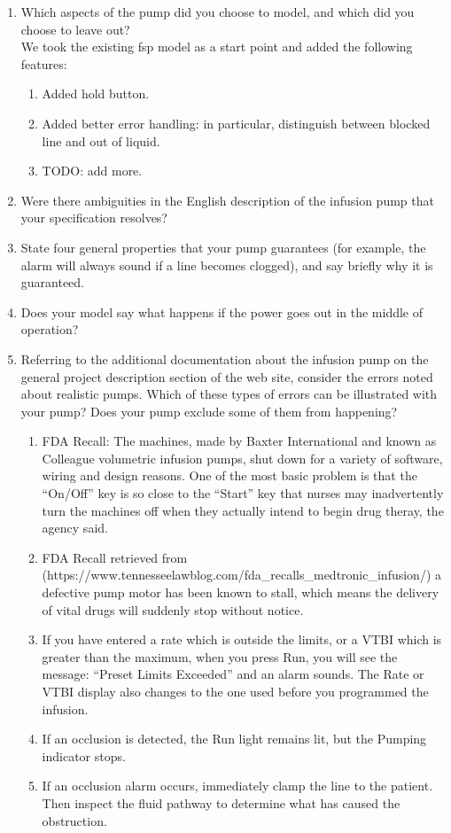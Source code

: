 \documentclass{article}
\begin{document}
\begin{enumerate}
\item Which aspects of the pump did you choose to model, and which did you choose to leave out? \\
  We took the existing fsp model as a start point and added the following features: \\
  \begin{enumerate}
  \item Added hold button.
  \item Added better error handling: in particular, distinguish between blocked line and out of liquid.
    \item TODO: add more.
  \end{enumerate}
    \item Were there ambiguities in the English description of the infusion pump that your specification resolves?
    \item State four general properties that your pump guarantees (for example, the alarm will always sound if a line becomes clogged), and say briefly why it is guaranteed.
    \item Does your model say what happens if the power goes out in the middle of operation?
    \item Referring to the additional documentation about the infusion pump on the general project description section of the web site, consider the errors noted about realistic pumps. Which of these types of errors can be illustrated with your pump? Does your pump exclude some of them from happening? \\
      \begin{enumerate}
      \item FDA Recall: The machines, made by Baxter International and known as Colleague volumetric infusion pumps, shut down for a variety of software, wiring and design reasons. One of the most basic problem is that the ``On/Off'' key is so close to the ``Start'' key that nurses may inadvertently turn the machines off when they actually intend to begin drug theray, the agency said.
      \item FDA Recall retrieved from (https://www.tennesseelawblog.com/fda_recalls_medtronic_infusion/) a defective pump motor has been known to stall, which means the delivery of vital drugs will suddenly stop without notice.
      \item If you have entered a rate which is outside the limits, or a VTBI which is greater than the maximum, when you press Run, you will see the message: ``Preset Limits Exceeded'' and an alarm sounds. The Rate or VTBI display also changes to the one used before you programmed the infusion.
      \item If an occlusion is detected, the Run light remains lit, but the Pumping indicator stops.
      \item If an occlusion alarm occurs, immediately clamp the line to the patient. Then inspect the fluid pathway to determine what has caused the obstruction. 
      \end{enumerate}

\end{enumerate}
\end{document}
